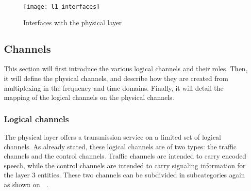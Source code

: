     \begin{figure}[h]
      \centering
      \texttt{[image: l1\_interfaces]}
      \caption{Interfaces with the physical layer~\cite{etsi_gsm_1997}}
      \label{fig:l1_interfaces}
    \end{figure}

  \subsection{Channels}

    This section will first introduce the various logical channels and
    their roles. Then, it will define the physical channels, and
    describe how they are created from multiplexing in the frequency and
    time domains. Finally, it will detail the mapping of the logical
    channels on the physical channels.

    \subsubsection{Logical channels}


      The physical layer offers a transmission service on a limited set
      of logical channels. As already stated, these logical channels are
      of two types: the traffic channels and the control channels.
      Traffic channels are intended to carry encoded speech, while the
      control channels are intended to carry signaling information for
      the layer 3 entities. These two channels can be subdivided in
      subcategories again as shown
      on~~\cite{3gpp_ts_2014-3,3gpp_ts_2015-4}.

